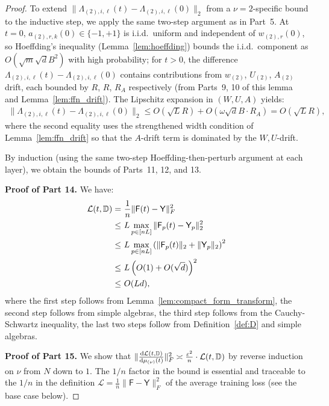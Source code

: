 \documentclass[11pt]{article}
\theoremstyle{plain}
\renewcommand{\d}{\mathrm{d}}
\begin{document}
\begin{proof}
    To extend $\|\Lambda_{(2),i,\ell}(t)-\Lambda_{(2),i,\ell}(0)\|_2$ from a $\nu=2$-specific bound to the inductive step, we apply the same two-step argument as in Part~5. At $t=0$, $a_{(2),r,k}(0)\in\{-1,+1\}$ is i.i.d.\ uniform and independent of $w_{(2),r}(0)$, so Hoeffding's inequality (Lemma~\ref{lem:hoeffding}) bounds the i.i.d.\ component as $O(\sqrt{m}\sqrt{d}B^2)$ with high probability; for $t>0$, the difference $\Lambda_{(2),i,\ell}(t)-\Lambda_{(2),i,\ell}(0)$ contains contributions from $w_{(2)}$, $U_{(2)}$, $A_{(2)}$ drift, each bounded by $R$, $R$, $R_A$ respectively (from Parts~9, 10 of this lemma and Lemma~\ref{lem:ffn_drift}). The Lipschitz expansion in $(W, U, A)$ yields:
    \begin{align*}
        \|\Lambda_{(2),i,\ell}(t)-\Lambda_{(2),i,\ell}(0)\|_2 \le O(\sqrt L R) + O(\omega \sqrt d B \cdot R_A) = O(\sqrt L R),
    \end{align*}
    where the second equality uses the strengthened width condition of Lemma~\ref{lem:ffn_drift} so that the $A$-drift term is dominated by the $W,U$-drift.

    By induction (using the same two-step Hoeffding-then-perturb argument at each layer), we obtain the bounds of Parts~11, 12, and 13.

    {\bf Proof of Part 14.}
    We have:
    \begin{align*}
        {\cal L}(t, \mathbb{D}) = & ~ \frac{1}{n} \| {\sf F}(t) - {\sf Y} \|_F^2 \\
        \leq & ~ L\max_{p \in [nL]} \| {\sf F}_p(t) - {\sf Y}_p \|_2^2 \\
        \leq & ~ L\max_{p \in [nL]} \left( \| {\sf F}_p(t)\|_2 +  \| {\sf Y}_p \|_2 \right)^2 \\
        \leq & ~ L \left( O(1) + O(\sqrt{d}) \right)^2 \\
        \leq & ~ O(Ld),
    \end{align*}
    where the first step follows from Lemma~\ref{lem:compact_form_transform}, the second step follows from simple algebras, the third step follows from the Cauchy-Schwartz inequality, the last two steps follow from Definition~\ref{def:D} and simple algebras.

    {\bf Proof of Part 15.}
    We show that $\|\frac{\d {\cal L}(t,\mathbb{D})}{\d\mu_{(\nu)}(t)}\|_F^2 \asymp \frac{\varepsilon^2}{n} \cdot {\cal L}(t,\mathbb{D})$ by reverse induction on $\nu$ from $N$ down to $1$. The $1/n$ factor in the bound is essential and traceable to the $1/n$ in the definition $\mathcal{L} = \frac{1}{n}\|\mathsf{F}-\mathsf{Y}\|_F^2$ of the average training loss (see the base case below).


\end{proof}
\end{document}
